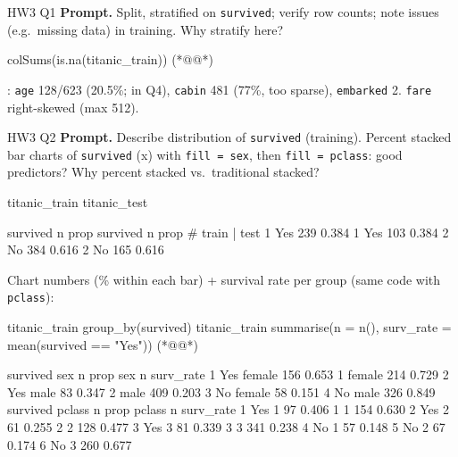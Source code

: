 \begin{qbox}{HW3 Q1}
\textbf{Prompt.} Split, stratified on \texttt{survived}; verify row counts; note issues (e.g.\ missing data) in training. Why stratify here?
\begin{rcode}
colSums(is.na(titanic_train))  (*@@*)
\end{rcode}
\ans {}: \texttt{age} 128/623 (20.5\%;  in Q4), \texttt{cabin} 481 (77\%, too sparse), \texttt{embarked} 2. \texttt{fare} right-skewed (max 512).
\end{qbox}

\begin{qbox}{HW3 Q2}
\textbf{Prompt.} Describe distribution of \texttt{survived} (training). Percent stacked bar charts of \texttt{survived} (x) with \texttt{fill = sex}, then \texttt{fill = pclass}: good predictors? Why percent stacked vs.\ traditional stacked?
\begin{rcode}
titanic_train %
titanic_test %
\end{rcode}
\begin{routput}
  survived  n  prop       survived  n  prop   # train | test
1 Yes     239 0.384     1 Yes     103 0.384
2 No      384 0.616     2 No      165 0.616
\end{routput}
Chart numbers (\% within each bar) + survival rate per group (same code with \texttt{pclass}):
\begin{rcode}
titanic_train %
  group_by(survived) %
titanic_train %
  summarise(n = n(), surv_rate = mean(survived == "Yes"))  (*@@*)
\end{rcode}
\begin{routput}
  survived sex        n  prop       sex        n surv_rate
1 Yes      female   156 0.653     1 female   214     0.729
2 Yes      male      83 0.347     2 male     409     0.203
3 No       female    58 0.151
4 No       male     326 0.849
  survived pclass     n  prop       pclass     n surv_rate
1 Yes      1         97 0.406     1 1        154     0.630
2 Yes      2         61 0.255     2 2        128     0.477
3 Yes      3         81 0.339     3 3        341     0.238
4 No       1         57 0.148
5 No       2         67 0.174
6 No       3        260 0.677
\end{routput}
\end{qbox}

